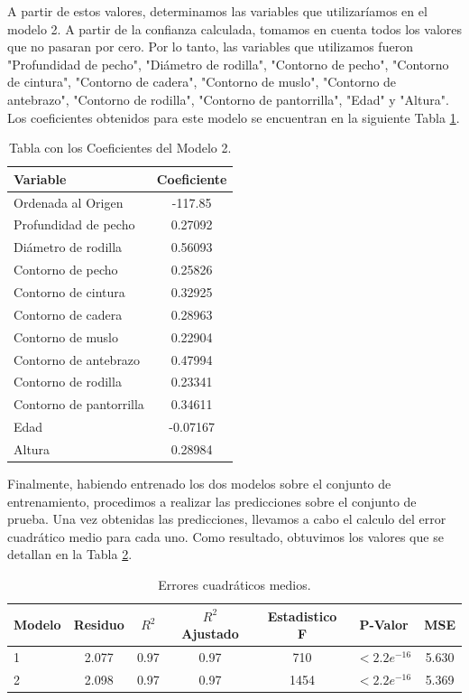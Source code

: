 \documentclass{article} %
\begin{document}
A partir de estos valores, determinamos las variables que utilizaríamos en el modelo 2. A partir de la confianza calculada, tomamos en cuenta todos los valores que no pasaran por cero. Por lo tanto, las variables que utilizamos fueron "Profundidad de pecho", "Diámetro de rodilla", "Contorno de pecho", "Contorno de cintura", "Contorno de cadera", "Contorno de muslo", "Contorno de antebrazo", "Contorno de rodilla", "Contorno de pantorrilla", "Edad" y "Altura". Los coeficientes obtenidos para este modelo se encuentran en la siguiente Tabla \ref{tab:table-punto-1-3-c}.

\begin{table}[H]
	\centering
		\begin{tabular}{||l | c ||}
			\hline
			\hline
			Variable & Coeficiente \\
			\hline			
			\hline
			Ordenada al Origen & -117.85  \\
			\hline
			Profundidad de pecho & 0.27092\\
			\hline
			Diámetro de rodilla &  0.56093\\
			\hline
			Contorno de pecho &  0.25826\\
			\hline
			Contorno de cintura & 0.32925\\
			\hline
			Contorno de cadera &  0.28963\\
			\hline
			Contorno de muslo & 0.22904\\
			\hline
			Contorno de antebrazo &  0.47994\\
			\hline
			Contorno de rodilla & 0.23341\\
			\hline
			Contorno de pantorrilla & 0.34611\\
			\hline
			Edad & -0.07167\\
			\hline
			Altura & 0.28984\\
			\hline
			\hline
		\end{tabular}
		\caption{Tabla con los Coeficientes del Modelo 2.}
	\label{tab:table-punto-1-3-c}
\end{table}

Finalmente, habiendo entrenado los dos modelos sobre el conjunto de entrenamiento, procedimos a realizar las predicciones sobre el conjunto de prueba. Una vez obtenidas las predicciones, llevamos a cabo el calculo del error cuadrático medio para cada uno. Como resultado, obtuvimos los valores que se detallan en la Tabla \ref{tab:table-punto-1-3-d}.


\begin{table}[H]
	\centering
		\begin{tabular}{||l | c || c || c || c || c || c ||}
			\hline
			\hline
			Modelo & Residuo & $R^2$ & $R^2$ Ajustado & Estadistico F & P-Valor & MSE\\
			\hline			
			\hline
			1 & 2.077 & 0.97 & 0.97 & 710 & $<2.2e^{-16}$ & 5.630\\
			\hline
			2 & 2.098 & 0.97 & 0.97 & 1454 & $<2.2e^{-16}$ & 5.369\\
			\hline
			\hline
		\end{tabular}
		\caption{Errores cuadráticos medios.}
	\label{tab:table-punto-1-3-d}
\end{table}
\end{document}
